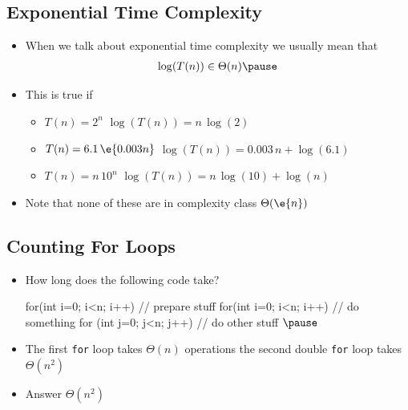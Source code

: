 \begin{slide}
\section[-1]{Exponential Time Complexity}

\begin{PauseHighLight}
  \begin{itemize}
  \item When we talk about exponential time complexity we usually mean
    that
    \begin{align*}
      \log(T(n)) \in \Theta(n) \pause
    \end{align*}
  \item This is true if
    \begin{itemize}
    \item $T(n) = 2^n$ \pause{} \hspace{3.5cm} $\log(T(n)) =
      n\,\log(2)$ \pauseb
    \item {}$T(n) = 6.1\,\e{0.003n}$\pause{} \hspace{1cm} $\log(T(n)) =
      0.003\,n + \log(6.1)$ \pauseb
    \item {}$T(n) = n \, 10^n$\pause\pause{} \hspace{2.7cm} $\log(T(n)) =
      n\,\log(10) + \log(n)$ \pauseb
    \end{itemize}
  \item Note that none of these are in complexity class $\Theta(\e{n})$\pause
  \end{itemize}
\end{PauseHighLight}

\end{slide}


\Outline %

\begin{slide}
\section[-1]{Counting For Loops}

\begin{PauseHighLight}
  \begin{itemize}
  \item How long does the following code take?
\begin{java}
for(int i=0; i<n; i++)  {
  // prepare stuff
}
for(int i=0; i<n; i++)  {
  // do something
  for (int j=0; j<n; j++) {
    // do other stuff
  }
} $\pause$
\end{java}
\item The first \texttt{for} loop takes $\Theta(n)$ operations the
  second double \texttt{for} loop takes $\Theta(n^2)$\pauseb
\item Answer $\Theta(n^2)$\pauseb
  \end{itemize}
\end{PauseHighLight}

\end{slide}

